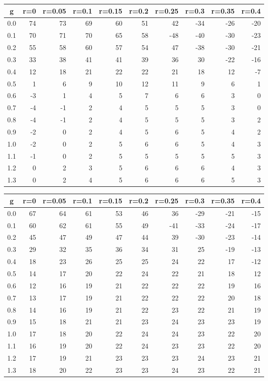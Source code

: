 %
\begin{table}[!tbp]
 \begin{center}
 \begin{tabular}{rrrrrrrrrr}\hline\hline
\multicolumn{1}{c}{g}&\multicolumn{1}{c}{r=0}&\multicolumn{1}{c}{r=0.05}&\multicolumn{1}{c}{r=0.1}&\multicolumn{1}{c}{r=0.15}&\multicolumn{1}{c}{r=0.2}&\multicolumn{1}{c}{r=0.25}&\multicolumn{1}{c}{r=0.3}&\multicolumn{1}{c}{r=0.35}&\multicolumn{1}{c}{r=0.4}\tabularnewline
\hline
0.0&74&73&69&60&51& 42&-34&-26&-20\tabularnewline
0.1&70&71&70&65&58&-48&-40&-30&-23\tabularnewline
0.2&55&58&60&57&54& 47&-38&-30&-21\tabularnewline
0.3&33&38&41&41&39& 36& 30&-22&-16\tabularnewline
0.4&12&18&21&22&22& 21& 18& 12& -7\tabularnewline
0.5& 1& 6& 9&10&12& 11&  9&  6&  1\tabularnewline
0.6&-3& 1& 4& 5& 7&  6&  6&  3&  0\tabularnewline
0.7&-4&-1& 2& 4& 5&  5&  5&  3&  0\tabularnewline
0.8&-4&-1& 2& 4& 5&  5&  5&  3&  2\tabularnewline
0.9&-2& 0& 2& 4& 5&  6&  5&  4&  2\tabularnewline
1.0&-2& 0& 2& 5& 6&  6&  5&  4&  3\tabularnewline
1.1&-1& 0& 2& 5& 5&  5&  5&  5&  3\tabularnewline
1.2& 0& 2& 3& 5& 6&  6&  6&  4&  3\tabularnewline
1.3& 0& 2& 4& 5& 6&  6&  6&  5&  3\tabularnewline
\hline
\end{tabular}

\end{center}

\end{table}

%
\begin{table}[!tbp]
 \begin{center}
 \begin{tabular}{rrrrrrrrrr}\hline\hline
\multicolumn{1}{c}{g}&\multicolumn{1}{c}{r=0}&\multicolumn{1}{c}{r=0.05}&\multicolumn{1}{c}{r=0.1}&\multicolumn{1}{c}{r=0.15}&\multicolumn{1}{c}{r=0.2}&\multicolumn{1}{c}{r=0.25}&\multicolumn{1}{c}{r=0.3}&\multicolumn{1}{c}{r=0.35}&\multicolumn{1}{c}{r=0.4}\tabularnewline
\hline
0.0&67&64&61&53&46& 36&-29&-21&-15\tabularnewline
0.1&60&62&61&55&49&-41&-33&-24&-17\tabularnewline
0.2&45&47&49&47&44& 39&-30&-23&-14\tabularnewline
0.3&29&32&35&36&34& 31& 25&-19&-13\tabularnewline
0.4&18&23&26&25&25& 24& 22& 17&-12\tabularnewline
0.5&14&17&20&22&24& 22& 21& 18& 12\tabularnewline
0.6&12&16&19&21&22& 22& 22& 19& 16\tabularnewline
0.7&13&17&19&21&22& 22& 22& 20& 18\tabularnewline
0.8&14&16&19&21&22& 23& 22& 21& 19\tabularnewline
0.9&15&18&21&21&23& 24& 23& 23& 19\tabularnewline
1.0&17&18&20&22&24& 24& 23& 22& 20\tabularnewline
1.1&16&19&20&22&24& 23& 23& 22& 20\tabularnewline
1.2&17&19&21&23&23& 23& 24& 23& 21\tabularnewline
1.3&18&20&22&23&23& 24& 23& 22& 21\tabularnewline
\hline
\end{tabular}

\end{center}

\end{table}

